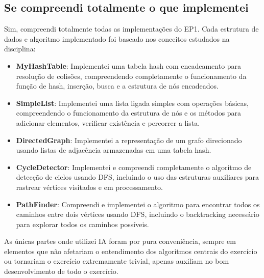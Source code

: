 \documentclass[12pt]{article}
\begin{document}
\subsection{Se compreendi totalmente o que implementei}

Sim, compreendi totalmente todas as implementações do EP1. Cada estrutura de dados e algoritmo implementado foi baseado nos conceitos estudados na disciplina:

\begin{itemize}
    \item \textbf{MyHashTable}: Implementei uma tabela hash com encadeamento para resolução de colisões, compreendendo completamente o funcionamento da função de hash, inserção, busca e a estrutura de nós encadeados.
    \item \textbf{SimpleList}: Implementei uma lista ligada simples com operações básicas, compreendendo o funcionamento da estrutura de nós e os métodos para adicionar elementos, verificar existência e percorrer a lista.
    \item \textbf{DirectedGraph}: Implementei a representação de um grafo direcionado usando listas de adjacência armazenadas em uma tabela hash.
    \item \textbf{CycleDetector}: Implementei e compreendi completamente o algoritmo de detecção de ciclos usando DFS, incluindo o uso das estruturas auxiliares para rastrear vértices visitados e em processamento.
    \item \textbf{PathFinder}: Compreendi e implementei o algoritmo para encontrar todos os caminhos entre dois vértices usando DFS, incluindo o backtracking necessário para explorar todos os caminhos possíveis.
\end{itemize}

As únicas partes onde utilizei IA foram por pura conveniência, sempre em elementos que não afetariam o entendimento dos algoritmos centrais do exercício ou tornariam o exercício extremamente trivial, apenas auxiliam no bom desenvolvimento de todo o exercício.
\end{document}
